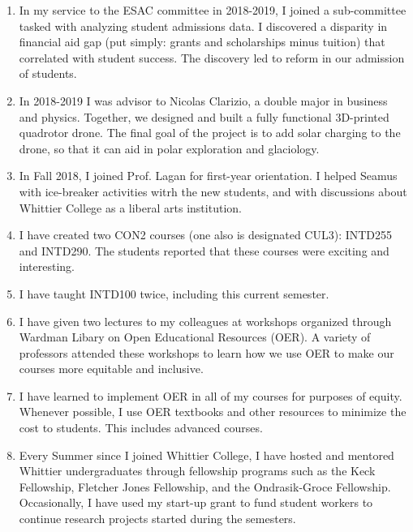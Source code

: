 \documentclass[../../../main.tex]{subfiles}
\begin{document}
\begin{enumerate}
\item In my service to the ESAC committee in 2018-2019, I joined a sub-committee tasked with analyzing student admissions data.  I discovered a disparity in financial aid gap (put simply: grants and scholarships minus tuition) that correlated with student success.  The discovery led to reform in our admission of students.
\item In 2018-2019 I was advisor to Nicolas Clarizio, a double major in business and physics.  Together, we designed and built a fully functional 3D-printed quadrotor drone.  The final goal of the project is to add solar charging to the drone, so that it can aid in polar exploration and glaciology.
\item In Fall 2018, I joined Prof. Lagan for first-year orientation. I helped Seamus with ice-breaker activities witrh the new students, and with discussions about Whittier College as a liberal arts institution.
\item I have created two CON2 courses (one also is designated CUL3): INTD255 and INTD290.  The students reported that these courses were exciting and interesting.
\item I have taught INTD100 twice, including this current semester.
\item I have given two lectures to my colleagues at workshops organized through Wardman Libary on Open Educational Resources (OER).  A variety of professors attended these workshops to learn how we use OER to make our courses more equitable and inclusive.
\item I have learned to implement OER in all of my courses for purposes of equity.  Whenever possible, I use OER textbooks and other resources to minimize the cost to students.  This includes advanced courses.
\item Every Summer since I joined Whittier College, I have hosted and mentored Whittier undergraduates through fellowship programs such as the Keck Fellowship, Fletcher Jones Fellowship, and the Ondrasik-Groce Fellowship.  Occasionally, I have used my start-up grant to fund student workers to continue research projects started during the semesters.
\end{enumerate}
\end{document}
